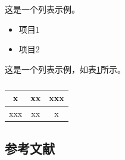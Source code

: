 这是一个列表示例。

\begin{itemize}
    \item 项目1
    \item 项目2
\end{itemize}

这是一个列表示例，如表\ref{tab:exp_3in1}所示。

\begin{table}[htbp]
    \centering
    \caption{}
    \label{tab:exp_3in1}
    \begin{tabular}{|c|c|c|}
        \hline
        x & xx & xxx \\
        \hline
        xxx & xx & x \\
        \hline
    \end{tabular}
\end{table}

{
\newpage

\subsection{参考文献}
{\normalfont{}\setlength{\baselineskip}{14pt}
\renewcommand{\refname}{\vspace{-\baselineskip}}
}
}